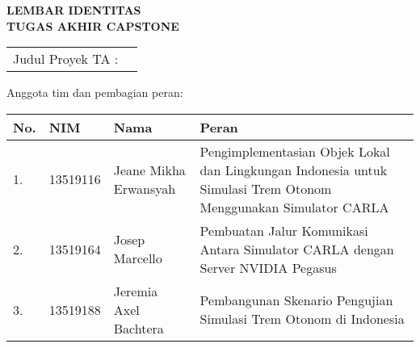 \clearpage
\pagestyle{empty}

\begin{center}
	\smallskip

	\Large \bfseries \MakeUppercase{
		Lembar Identitas \\
		Tugas Akhir Capstone
	}
	\vspace{0.5cm}

	\raggedright
	\begin{table}[h!]
		\large \bfseries
		\begin{tabular}{p{} p{}}
			Judul Proyek TA : & \capstonetitle
		\end{tabular}
	\end{table}

	\normalsize \normalfont

	Anggota tim dan pembagian peran:

	\begin{table}[h!]
		\begin{tabular}{|p{} | p{} | p{} | p{}|}
			\hline
			\textbf{No.} & \textbf{NIM} & \textbf{Nama}         & \textbf{Peran}                                                                                                 \\
			\hline
			1.           & 13519116     & Jeane Mikha Erwansyah & Pengimplementasian Objek Lokal dan Lingkungan Indonesia untuk Simulasi Trem Otonom Menggunakan Simulator CARLA \\
			\hline
			2.           & 13519164     & Josep Marcello        & Pembuatan Jalur Komunikasi Antara Simulator CARLA dengan Server NVIDIA Pegasus                                 \\
			\hline
			3.           & 13519188     & Jeremia Axel Bachtera & Pembangunan Skenario Pengujian Simulasi Trem Otonom di Indonesia                                               \\
			\hline
		\end{tabular}
	\end{table}

	\vfill
	\advisorapproval

\end{center}
\clearpage